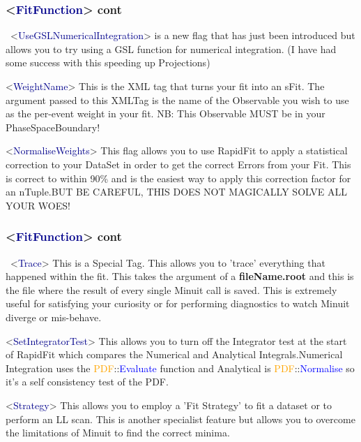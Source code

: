 \documentclass{beamer}
\begin{document}
\begin{frame}
\frametitle{<\textcolor{darkblue}{FitFunction}> cont}
\scriptsize~<\textcolor{darkblue}{UseGSLNumericalIntegration}> is a new flag that has just been introduced but allows you to try using a GSL function for numerical integration.\newline
(I have had some success with this speeding up Projections)\newline\newline

<\textcolor{darkblue}{WeightName}> This is the XML tag that turns your fit into an sFit.\newline
The argument passed to this XMLTag is the name of the Observable you wish to use as the per-event weight in your fit.\newline
NB: This Observable MUST be in your PhaseSpaceBoundary!\newline\newline

<\textcolor{darkblue}{NormaliseWeights}> This flag allows you to use RapidFit to apply a statistical correction to your DataSet in order to get the correct Errors from your Fit.\newline
This is correct to within 90\% and is the easiest way to apply this correction factor for an nTuple.\newline BUT BE CAREFUL, THIS DOES NOT MAGICALLY SOLVE ALL YOUR WOES!\newline

\end{frame}

\begin{frame}
\frametitle{<\textcolor{darkblue}{FitFunction}> cont}
\scriptsize~<\textcolor{darkblue}{Trace}> This is a Special Tag.\newline
This allows you to 'trace' everything that happened within the fit.\newline
This takes the argument of a \textbf{fileName.root} and this is the file where the result of every single Minuit call is saved.\newline
This is extremely useful for satisfying your curiosity or for performing diagnostics to watch Minuit diverge or mis-behave.\newline\newline

<\textcolor{darkblue}{SetIntegratorTest}> This allows you to turn off the Integrator test at the start of RapidFit which compares the Numerical and Analytical Integrals.\newline Numerical Integration uses the \textcolor{orange}{PDF}::\textcolor{blue}{Evaluate} function and Analytical is \textcolor{orange}{PDF}::\textcolor{blue}{Normalise} so it's a self consistency test of the PDF.\newline\newline

<\textcolor{darkblue}{Strategy}> This allows you to employ a 'Fit Strategy' to fit a dataset or to perform an LL scan. This is another specialist feature but allows you to overcome the limitations of Minuit to find the correct minima.
\end{frame}
\end{document}
